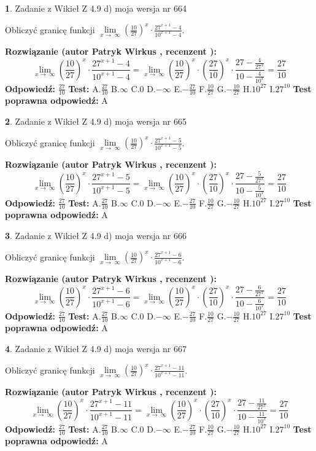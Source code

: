\documentclass[12pt, a4paper]{article}
\theoremstyle{definition} %
\newtheorem{zad}{}
\newcommand{\zadStart}[1]{\begin{zad}#1\newline}
\newcommand{\zadStop}{\end{zad}}
\newcommand{\rozwStart}[2]{\noindent \textbf{Rozwiązanie (autor #1 , recenzent #2): }\newline}
\newcommand{\rozwStop}{\newline}
\newcommand{\odpStart}{\noindent \textbf{Odpowiedź:}\newline}
\newcommand{\odpStop}{\newline}
\newcommand{\testStart}{\noindent \textbf{Test:}\newline}
\newcommand{\testStop}{\newline}
\newcommand{\kluczStart}{\noindent \textbf{Test poprawna odpowiedź:}\newline}
\newcommand{\kluczStop}{\newline}
\begin{document}
\zadStart{Zadanie z Wikieł Z 4.9 d) moja wersja nr 664}


Obliczyć granicę funkcji  $\lim\limits_{x\to\ \infty}(\frac{10}{27})^{x}\cdot\frac{27^{x+1}-4}{10^{x+1}-4}$.
\zadStop
\rozwStart{Patryk Wirkus}{}
$$\lim\limits_{x\to\ \infty}(\frac{10}{27})^{x}\cdot\frac{27^{x+1}-4}{10^{x+1}-4}=\lim\limits_{x\to\ \infty}(\frac{10}{27})^{x}\cdot(\frac{27}{10})^{x} \cdot \frac{27-\frac{4}{27^{x}}}{10-\frac{4}{10^{x}}} = \frac{27}{10}$$
\rozwStop
\odpStart
$\frac{27}{10}$
\odpStop
\testStart
A.$\frac{27}{10}$ B.$\infty$ C.$0$ D.$-\infty$ E.$-\frac{27}{10}$
F.$\frac{10}{27}$ G.$-\frac{10}{27}$
H.$10^{27}$
I.$27^{10}$
\testStop
\kluczStart
A
\kluczStop



\zadStart{Zadanie z Wikieł Z 4.9 d) moja wersja nr 665}


Obliczyć granicę funkcji  $\lim\limits_{x\to\ \infty}(\frac{10}{27})^{x}\cdot\frac{27^{x+1}-5}{10^{x+1}-5}$.
\zadStop
\rozwStart{Patryk Wirkus}{}
$$\lim\limits_{x\to\ \infty}(\frac{10}{27})^{x}\cdot\frac{27^{x+1}-5}{10^{x+1}-5}=\lim\limits_{x\to\ \infty}(\frac{10}{27})^{x}\cdot(\frac{27}{10})^{x} \cdot \frac{27-\frac{5}{27^{x}}}{10-\frac{5}{10^{x}}} = \frac{27}{10}$$
\rozwStop
\odpStart
$\frac{27}{10}$
\odpStop
\testStart
A.$\frac{27}{10}$ B.$\infty$ C.$0$ D.$-\infty$ E.$-\frac{27}{10}$
F.$\frac{10}{27}$ G.$-\frac{10}{27}$
H.$10^{27}$
I.$27^{10}$
\testStop
\kluczStart
A
\kluczStop



\zadStart{Zadanie z Wikieł Z 4.9 d) moja wersja nr 666}


Obliczyć granicę funkcji  $\lim\limits_{x\to\ \infty}(\frac{10}{27})^{x}\cdot\frac{27^{x+1}-6}{10^{x+1}-6}$.
\zadStop
\rozwStart{Patryk Wirkus}{}
$$\lim\limits_{x\to\ \infty}(\frac{10}{27})^{x}\cdot\frac{27^{x+1}-6}{10^{x+1}-6}=\lim\limits_{x\to\ \infty}(\frac{10}{27})^{x}\cdot(\frac{27}{10})^{x} \cdot \frac{27-\frac{6}{27^{x}}}{10-\frac{6}{10^{x}}} = \frac{27}{10}$$
\rozwStop
\odpStart
$\frac{27}{10}$
\odpStop
\testStart
A.$\frac{27}{10}$ B.$\infty$ C.$0$ D.$-\infty$ E.$-\frac{27}{10}$
F.$\frac{10}{27}$ G.$-\frac{10}{27}$
H.$10^{27}$
I.$27^{10}$
\testStop
\kluczStart
A
\kluczStop



\zadStart{Zadanie z Wikieł Z 4.9 d) moja wersja nr 667}


Obliczyć granicę funkcji  $\lim\limits_{x\to\ \infty}(\frac{10}{27})^{x}\cdot\frac{27^{x+1}-11}{10^{x+1}-11}$.
\zadStop
\rozwStart{Patryk Wirkus}{}
$$\lim\limits_{x\to\ \infty}(\frac{10}{27})^{x}\cdot\frac{27^{x+1}-11}{10^{x+1}-11}=\lim\limits_{x\to\ \infty}(\frac{10}{27})^{x}\cdot(\frac{27}{10})^{x} \cdot \frac{27-\frac{11}{27^{x}}}{10-\frac{11}{10^{x}}} = \frac{27}{10}$$
\rozwStop
\odpStart
$\frac{27}{10}$
\odpStop
\testStart
A.$\frac{27}{10}$ B.$\infty$ C.$0$ D.$-\infty$ E.$-\frac{27}{10}$
F.$\frac{10}{27}$ G.$-\frac{10}{27}$
H.$10^{27}$
I.$27^{10}$
\testStop
\kluczStart
A
\kluczStop
\end{document}
